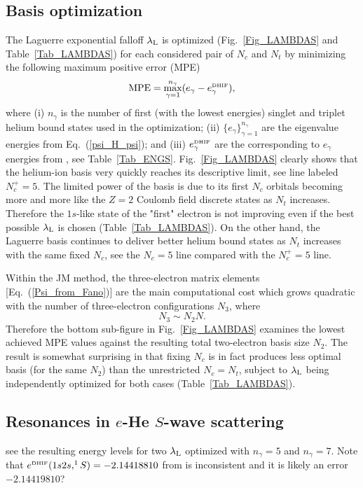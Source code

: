 \documentclass[aip
, pra
, showpacs
, aps
, twocolumn
, groupedaddress
, floatfix
]{revtex4}
\newcommand{\beq}{\begin{equation}}
\newcommand{\eeq}{\end{equation}}
\begin{document}
\subsection{Basis optimization}
The Laguerre exponential falloff $\lambda_{\rm L}$ is optimized (Fig.~\ref{Fig_LAMBDAS} and Table~\ref{Tab_LAMBDAS})
for each considered pair of $N_c$ and $N_t$ by minimizing
the following maximum positive error (MPE)
\beq
{\rm MPE} = \max_{\gamma = 1}^{n_\gamma} (e_\gamma - e_\gamma^{\mbox{\tiny{DHIF}} }),
\label{MPE}
\eeq
where (i) $n_\gamma$ is the number of first (with the lowest energies) singlet and triplet helium bound states used
in the optimization;
(ii) $\{e_\gamma\}_{\gamma=1}^{n_\gamma}$ are the eigenvalue energies from Eq.~(\ref{psi_H_psi}); and
(iii) $e_\gamma^{\mbox{\tiny{DHIF}}}$ are the corresponding to $e_\gamma$ energies from \citet{DHIF94}, see Table~\ref{Tab_ENGS}.
Fig.~\ref{Fig_LAMBDAS} clearly shows that the helium-ion basis very quickly reaches its descriptive limit, see line labeled $N_c^+=5$.
The limited power of the basis is due to its first $N_c$
orbitals becoming more and more like the $Z=2$ Coulomb field discrete states as $N_t$ increases.
Therefore the $1s$-like state of the "first" electron is not improving even if the best possible $\lambda_{\rm L}$  is chosen
(Table~\ref{Tab_LAMBDAS}).
On the other hand, the Laguerre basis continues to deliver better helium bound states as $N_t$ increases with the same fixed $N_c$,
see the $N_c=5$ line compared with the $N_c^+=5$ line.


Within the JM method, the three-electron matrix elements [Eq.~(\ref{Psi_from_Fano})] are the main computational cost which
grows quadratic with the number of three-electron configurations $N_3$, where
\beq N_3 \sim N_2 N.
\eeq
Therefore the bottom sub-figure in Fig.~\ref{Fig_LAMBDAS} examines the lowest achieved MPE values
against the resulting total two-electron basis size $N_2$.
The result is somewhat surprising in that fixing $N_c$ is in fact produces less optimal basis (for the same $N_2$)
than the unrestricted $N_c=N_t$, subject to $\lambda_{\rm L}$ being independently optimized
for both cases (Table~\ref{Tab_LAMBDAS}).


\subsection{Resonances in $e$-He $S$-wave scattering}

see the resulting energy levels for two $\lambda_{\rm L}$ optimized with $n_\gamma=5$ and $n_\gamma=7$.
Note that $e^{\mbox{\tiny{DHIF}}}(1s2s,^1S)=-2.14418810$ from \cite{DHIF94} is inconsistent
and it is likely an error $-2.14419810$?
\end{document}
